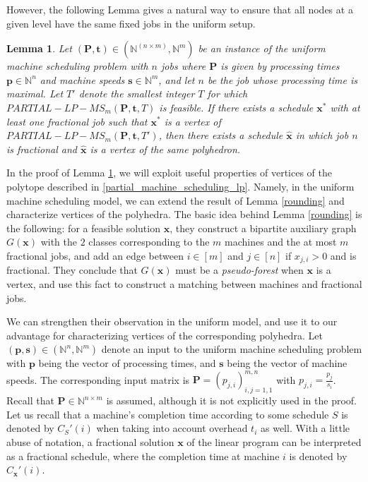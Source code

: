 \documentclass[moor,sglanonrev]{informs4}
\theoremstyle{plain}
\newtheorem{lmm}{Lemma}  %
\begin{document}
However, the following Lemma gives a natural way to ensure that all nodes at a given level have the same fixed jobs in the uniform setup.

\begin{lmm}\label{longest_frac}
   Let $({\bm{P}}, \bm{t}) \in (\mathbb{N}^{(n\times m)}, \mathbb{N}^m)$ be an instance of the uniform machine scheduling problem with $n$ jobs where $\bm{P}$ is given by processing times $\bm{p} \in \mathbb{N}^n$ and machine speeds $\bm{s}\in \mathbb{N}^m$, and let $n$ be the job whose processing time is maximal. Let $T'$ denote the smallest integer $T$ for which $PARTIAL-LP-MS_m (\bm{P}, \bm{t}, T)$ is feasible. If there exists a schedule $\bm{x}^*$ with at least one fractional job such that $\bm{x^*}$ is a vertex of $PARTIAL-LP-MS_m (\bm{P}, \bm{t}, T')$, then there exists a schedule $\bm{\hat{x}}$ in which job $n$ is fractional and $\bm{\hat{x}}$ is a vertex of the same polyhedron.
\end{lmm}

In the proof of Lemma \ref{longest_frac}, we will exploit useful properties of vertices of the polytope described in \eqref{partial_machine_scheduling_lp}. Namely, in the uniform machine scheduling model, we can extend the result of Lemma \ref{rounding} and characterize vertices of the polyhedra. The basic idea behind Lemma \ref{rounding} is the following: for a feasible solution $\bm{x}$, they construct a bipartite auxiliary graph $G(\bm{x})$ with the $2$ classes corresponding to the $m$ machines and the at most $m$ fractional jobs, and add an edge between $ i \in [m]$ and $j \in [n]$ if $x_{j, i} >0$ and is fractional. They conclude that $G(\bm{x})$ must be a \emph{pseudo-forest} when $\bm{x}$ is a vertex, and use this fact to construct a matching between machines and fractional jobs. 

We can strengthen their observation in the uniform model, and use it to our advantage for characterizing vertices of the corresponding polyhedra. Let $(\bm{p}, \bm{s}) \in (\mathbb{N}^{n}, \mathbb{N}^{m})$ denote an input to the uniform machine scheduling problem with $\bm{p}$ being the vector of processing times, and $\bm{s}$ being the vector of machine speeds. The corresponding input matrix is $\bm{P} = (p_{j,i})_{i,j = 1, 1} ^{m, n}$ with $p_{j,i} = \frac{p_j}{s_i}$. Recall that $\bm{P} \in \mathbb{N}^{n \times m}$ is assumed, although it is not explicitly used in the proof. Let us recall that a machine's completion time according to some schedule $S$ is denoted by $C_S'(i)$ when taking into account overhead $t_i$ as well. With a little abuse of notation, a fractional solution $\bm{x}$ of the linear program can be interpreted as a fractional schedule, where the completion time at machine $i$ is denoted by $C_{\bm{x}}'(i)$.
\end{document}
